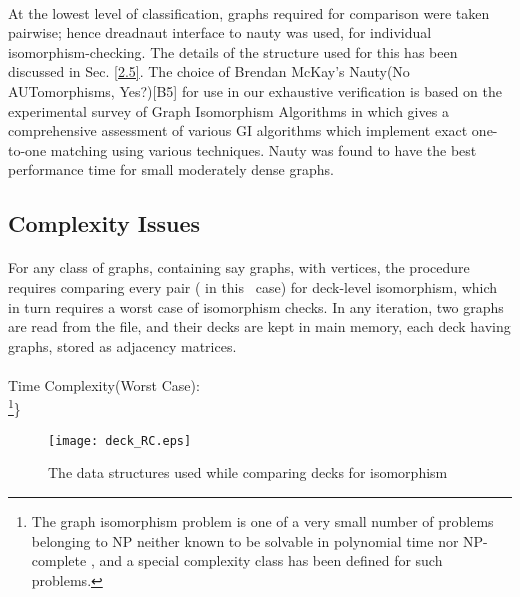 \documentclass[12pt,conference]{IEEEtran}
\begin{document}
\paragraph*{} At the lowest level of classification, graphs required for comparison were taken pairwise; hence dreadnaut interface to nauty \cite{b5} was used, for individual isomorphism-checking. The details of the structure used for this has been discussed in Sec. \ref{2.5}. The choice of Brendan McKay’s Nauty(No AUTomorphisms, Yes?)[B5] for use in our exhaustive verification is based on the experimental survey of Graph Isomorphism Algorithms in \cite{f1} which gives a comprehensive assessment of various GI algorithms which implement exact one-to-one matching using various techniques. Nauty was found to have the best performance time for small moderately dense graphs. 



\subsection{\label{2.2} Complexity Issues }
\paragraph*{} For any class of graphs, containing say  graphs, with  vertices, the procedure requires comparing every pair ( in this  case) for deck-level isomorphism, which in turn requires a worst case of  isomorphism checks. In any iteration, two graphs are read from the file, and their decks are kept in main memory, each deck having  graphs, stored as adjacency matrices.
\paragraph*{}
Time Complexity(Worst Case): \\  
           \hspace*{2 cm} \footnote { The graph isomorphism problem is one of a very small number of problems belonging to NP neither known to be solvable in polynomial time nor NP-complete \cite{g1}, and a special complexity class  has been defined for such problems.}\} 



\begin{figure*}
	  \centering 
           \texttt{[image: deck\_RC.eps]}
	   \caption{The data structures used while comparing decks for isomorphism}
	   \label{deck}
  \end{figure*} 
\end{document}
